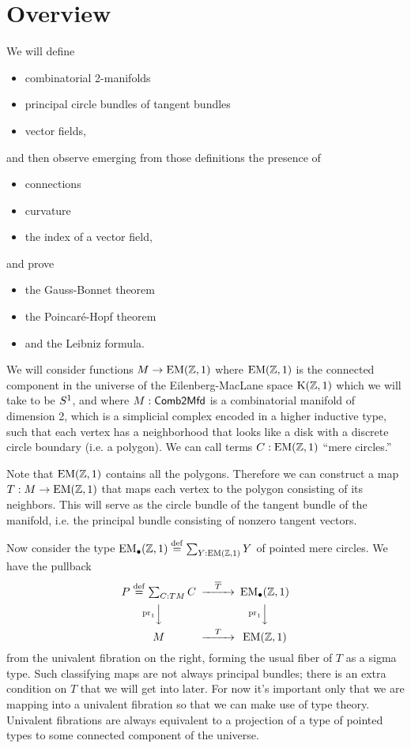 \section{Overview}
We will define 
\begin{itemize}
\item combinatorial 2-manifolds
\item principal circle bundles of tangent bundles
\item vector fields,
\end{itemize}
and then observe emerging from those definitions the presence of
\begin{itemize}
\item connections
\item curvature
\item the index of a vector field,
\end{itemize}
and prove
\begin{itemize}
\item the Gauss-Bonnet theorem
\item the Poincaré-Hopf theorem
\item and the Leibniz formula.
\end{itemize}

We will consider functions \( M\to \mathrm{EM}(\mathbb{Z},1) \) where \( \mathrm{EM}(\mathbb{Z},1) \) is the connected component in the universe of the Eilenberg-MacLane space \( \mathrm{K}(\mathbb{Z},1) \) which we will take to be \( S^1 \), and where \( M:\mathsf{Comb2Mfd} \) is a combinatorial manifold of dimension 2, which is a simplicial complex encoded in a higher inductive type, such that each vertex has a neighborhood that looks like a disk with a discrete circle boundary (i.e. a polygon). We can call terms \( C:\mathrm{EM}(\mathbb{Z},1) \) ``mere circles.''

Note that \( \mathrm{EM}(\mathbb{Z},1) \) contains all the polygons. Therefore we can construct a map \( T:M\to\mathrm{EM}(\mathbb{Z},1) \) that maps each vertex to the polygon consisting of its neighbors. This will serve as the circle bundle of the tangent bundle of the manifold, i.e. the principal bundle consisting of nonzero tangent vectors.

Now consider the type \( \mathrm{EM_{\bullet}}(\mathbb{Z},1)\stackrel{\mathrm{def}}{=} \sum_{Y:\mathrm{EM}(\mathbb{Z},1)}Y \) of pointed mere circles. We have the pullback
\[ 
\begin{CD}
P\defeq\sit{C:TM}C @>\overline{T}>> \EMp(\zz,1) \\
@V{\pr_1}VV @V{\pr_1}VV \\
M @>T>> \EM(\zz,1)
\end{CD}
\]
from the univalent fibration on the right, forming the usual fiber of \( T \) as a sigma type. Such classifying maps are not always principal bundles; there is an extra condition on \( T \) that we will get into later. For now it's important only that we are mapping into a univalent fibration so that we can make use of type theory. Univalent fibrations are always equivalent to a projection of a type of pointed types to some connected component of the universe.

